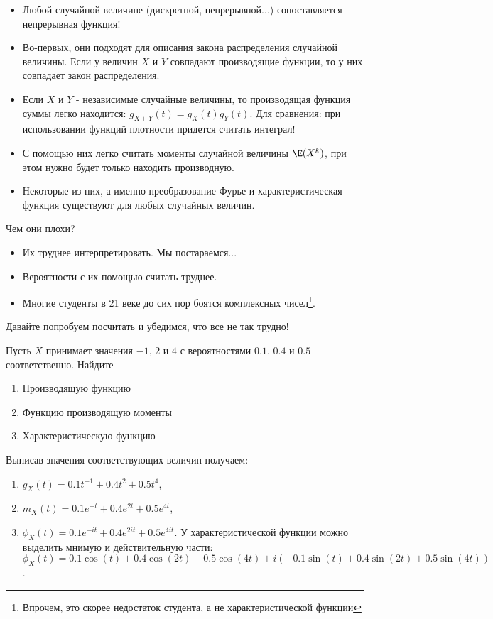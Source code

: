 {\begin{itemize}
\item Любой случайной величине (дискретной, непрерывной...) сопоставляется непрерывная функция!
\item Во-первых, они подходят для описания закона распределения случайной величины. Если у величин $X$ и $Y$ совпадают производящие функции, то у них совпадает закон распределения.
\item Если $X$ и $Y$ - независимые случайные величины, то производящая функция суммы легко находится: $g_{X+Y}(t)=g_{X}(t)g_{Y}(t)$. Для сравнения: при использовании функций плотности придется считать интеграл!
\item С помощью них легко считать моменты случайной величины $\E(X^{k})$, при этом нужно будет только находить производную. 
\item Некоторые из них, а именно преобразование Фурье и характеристическая функция существуют для любых случайных величин.
\end{itemize}

Чем они плохи?
\begin{itemize}

\item Их труднее интерпретировать. Мы постараемся...
\item Вероятности с их помощью считать труднее.
\item Многие студенты в 21 веке до сих пор боятся комплексных чисел\footnote{Впрочем, это скорее недостаток студента, а не характеристической функции}.
\end{itemize}

Давайте попробуем посчитать и убедимся, что все не так трудно!
\begin{myex} Пусть $X$ принимает значения $-1$, $2$ и $4$ с вероятностями $0.1$, $0.4$ и $0.5$ соответственно. Найдите
\begin{enumerate}
\item Производящую функцию 
\item Функцию производящую моменты 
\item Характеристическую функцию
\end{enumerate}
Выписав значения соответствующих величин получаем:
\begin{enumerate}
\item $g_{X}(t)=0.1t^{-1}+0.4t^{2}+0.5t^{4}$, 
\item $m_{X}(t)=0.1e^{-t}+0.4e^{2t}+0.5e^{4t}$, 
\item $\phi_{X}(t)=0.1e^{-it}+0.4e^{2it}+0.5e^{4it}$. У характеристической функции можно выделить мнимую и действительную части: $\phi_{X}(t)=0.1\cos(t)+0.4\cos(2t)+0.5\cos(4t)+i(-0.1\sin(t)+0.4\sin(2t)+0.5\sin(4t))$.
\end{enumerate}


\end{myex}}
